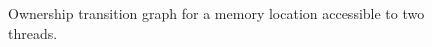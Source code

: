 \begin{figure}[t]
  \begin{center}
    {}
  \end{center}
  \vspace{-4mm}
  \caption{Ownership transition graph for a memory location accessible to two
    threads.}
  \label{fig:ownership-graph}
\end{figure}

